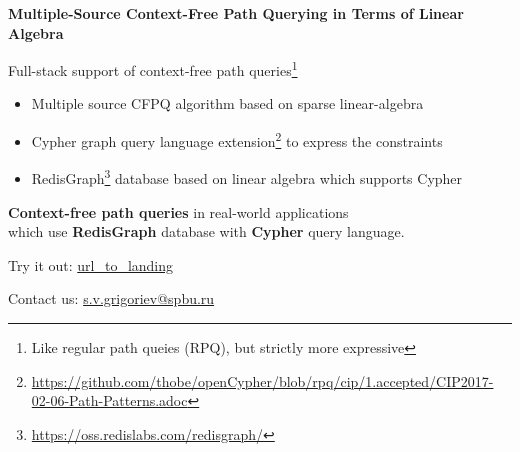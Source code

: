 \documentclass{article}
\begin{document}
\begin{center}
\textbf {\LARGE Multiple-Source Context-Free Path Querying in Terms of Linear Algebra}
\end{center}

\vfill

{\Large
\begin{center}
Full-stack support of context-free path queries\footnote{Like regular path queies (RPQ), but strictly more expressive}
\end{center}
} 

\vfill


{\large
\begin{itemize}
	\item Multiple source CFPQ algorithm based on sparse linear-algebra
	\item Cypher graph query language extension\footnote{\href{https://github.com/thobe/openCypher/blob/rpq/cip/1.accepted/CIP2017-02-06-Path-Patterns.adoc}{https://github.com/thobe/openCypher/blob/rpq/cip/1.accepted/CIP2017-02-06-Path-Patterns.adoc}} to express the constraints
    \item RedisGraph\footnote{\href{https://oss.redislabs.com/redisgraph/}{https://oss.redislabs.com/redisgraph/}} database based on linear algebra which supports Cypher
\end{itemize} 

\vfill

\begin{center}
\textbf{Context-free path queries} in real-world applications \\ which use \textbf{RedisGraph} database with \textbf{Cypher} query language.
\end{center}
}

\vspace{0.5cm} 


{ 




 Try it out: \url{url_to_landing}

 Contact us: \href{mailto:s.v.grigoriev@spbu.ru}{s.v.grigoriev@spbu.ru}
 }
\end{document}
